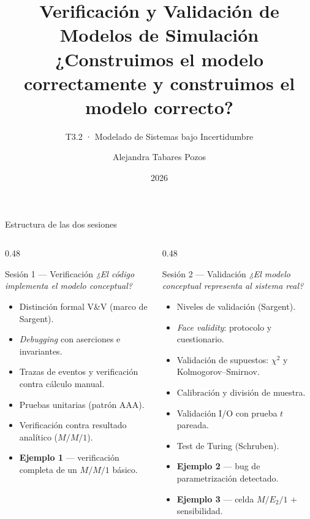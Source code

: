 \documentclass[aspectratio=1610, 10pt]{beamer}
\title[T3.2 V\&V]{%
  Verificación y Validación de Modelos de Simulación\\[2pt]
  \large ¿Construimos el modelo correctamente y construimos el modelo correcto?}
\subtitle{T3.2 · Modelado de Sistemas bajo Incertidumbre}
\author{Alejandra Tabares Pozos}
\institute{Universidad de los Andes · Ingeniería Industrial}
\date{2026}
\begin{document}

\begin{frame}\titlepage\end{frame}

\begin{frame}{Estructura de las dos sesiones}
  \begin{columns}[T]
    \begin{column}{0.48\textwidth}
      \begin{block}{Sesión 1 — Verificación}
        \footnotesize
        \emph{¿El código implementa el modelo conceptual?}
        \begin{itemize}\itemsep1pt
          \item Distinción formal V\&V (marco de Sargent).
          \item \emph{Debugging} con aserciones e invariantes.
          \item Trazas de eventos y verificación contra cálculo manual.
          \item Pruebas unitarias (patrón AAA).
          \item Verificación contra resultado analítico ($M/M/1$).
          \item \textbf{Ejemplo 1} — verificación completa de un $M/M/1$ básico.
        \end{itemize}
      \end{block}
    \end{column}
    \begin{column}{0.48\textwidth}
      \begin{alertblock}{Sesión 2 — Validación}
        \footnotesize
        \emph{¿El modelo conceptual representa al sistema real?}
        \begin{itemize}\itemsep1pt
          \item Niveles de validación (Sargent).
          \item \emph{Face validity}: protocolo y cuestionario.
          \item Validación de supuestos: $\chi^2$ y Kolmogorov--Smirnov.
          \item Calibración y división de muestra.
          \item Validación I/O con prueba $t$ pareada.
          \item Test de Turing (Schruben).
          \item \textbf{Ejemplo 2} — bug de parametrización detectado.
          \item \textbf{Ejemplo 3} — celda $M/E_2/1$ + sensibilidad.
        \end{itemize}
      \end{alertblock}
    \end{column}
  \end{columns}


\end{frame}
\end{document}
